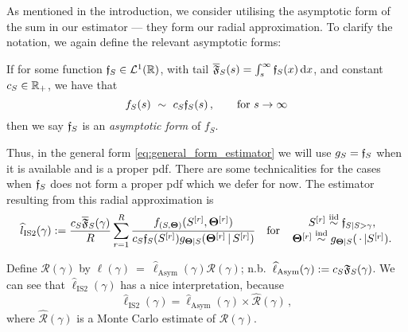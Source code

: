 As mentioned in the introduction, we consider utilising the asymptotic form of the sum in our estimator --- they form our radial approximation. To clarify the notation, we again define the relevant asymptotic forms:

\begin{definition}
If for some function $\mathfrak{f}_S \in \mathcal{L}^1(\mathbb{R})$, with tail $\overline{\mathfrak{F}}_S(s) = \int_s^\infty \mathfrak{f}_S(x) \mathop{}\!\mathrm{d} x$, and constant $c_S \in \mathbb{R}_+$, we have that
\begin{equation} \label{asymptotic_sum}
  f_S(s)\ \sim\ c_S \mathfrak{f}_S(s) \,,\qquad \text{for } s \to \infty
\end{equation}
then we say $\mathfrak{f}_S$ is an \emph{asymptotic form} of $f_S$. \remQED
\end{definition}

Thus, in the general form \eqref{eq:general_form_estimator} we will use $g_S = \mathfrak{f}_S$ when it is available and is a proper pdf. There are some technicalities for the cases when $\mathfrak{f}_S$ does not form a proper pdf which we defer for now.
The estimator resulting from this radial approximation is
\begin{equation} \label{eq:asymptotic_estimator}
\hat{l}_{\mathrm{IS2}}(\gamma) := \frac{c_S \AsymFTail(\gamma)}{R} \sum_{r=1}^R \frac{ f_{(S,\bfTheta)}(S^{[r]}, \bfTheta^{[r]}) }{ c_S \Asymf( S^{[r]} )g_{\bfTheta \mid S}(\bfTheta^{[r]}\,|\, S^{[r]})}
\quad \text{for} \quad
\genfrac{}{}{0pt}{}{S^{[r]} \iidDist \AsymfTrun, }{ \bfTheta^{[r]} \indDist g_{\bfTheta \mid S}( \,\cdot\, | S^{[r]}). }
\end{equation}

\begin{remark}
Define $\mathcal{R}(\gamma)$ by
$ \ell(\gamma)~=~\hat{\ell}_{\mathrm{Asym}}(\gamma) \mathcal{R}(\gamma) $; n.b.\ $\widehat{\ell}_{\mathrm{Asym}}(\gamma) := c_S \mathfrak{F}_S(\gamma)$.
We can see that $\hat{\ell}_{\mathrm{IS2}}(\gamma)$ has a nice interpretation, because
\[ \hat{\ell}_{\mathrm{IS2}}(\gamma) = \hat{\ell}_{\mathrm{Asym}}(\gamma) \times \hat{\mathcal{R}}(\gamma) \,, \]
where $\hat{\mathcal{R}}(\gamma)$ is a Monte Carlo estimate of $\mathcal{R}(\gamma)$. \remQED
\end{remark}

